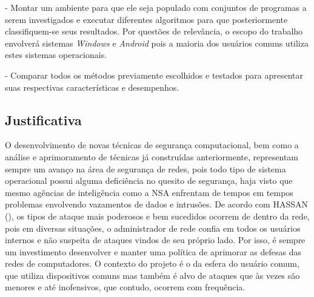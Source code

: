 - Montar um ambiente para que ele seja populado com conjuntos de programas a
  serem investigados e executar diferentes algoritmos para que posteriormente
  classifiquem-se seus resultados. Por questões de relevância, o escopo do
  trabalho envolverá sistemas \textit{Windows} e \textit{Android} pois a maioria dos usuários
  comuns utiliza estes sistemas operacionais.

- Comparar todos os métodos previamente escolhidos e testados para apresentar
  suas respectivas características e desempenhos.


\subsection{Justificativa}
\label{s.justificativa}

O desenvolvimento de novas técnicas de segurança computacional, bem como a
análise e aprimoramento de técnicas já construídas anteriormente, representam
sempre um avanço na área de segurança de redes, pois todo tipo de sistema
operacional possui alguma deficiência no quesito de segurança, haja visto que
mesmo agências de inteligência como a NSA enfrentam de tempos em tempos
problemas envolvendo vazamentos de dados e intrusões. De acordo com HASSAN (\citeyear{hassan10}), os tipos de ataque mais poderosos e bem
sucedidos ocorrem de dentro da rede, pois em diversas situações, o
administrador de rede confia em todos os usuários internos e não suspeita de
ataques vindos de seu próprio lado. Por isso, é sempre um investimento
desenvolver e manter uma política de aprimorar as defesas das redes de
computadores. O contexto do projeto é o da esfera do usuário comum, que
utiliza dispositivos comuns mas também é alvo de ataques que às vezes são
menores e até inofensivos, que contudo, ocorrem com frequência.